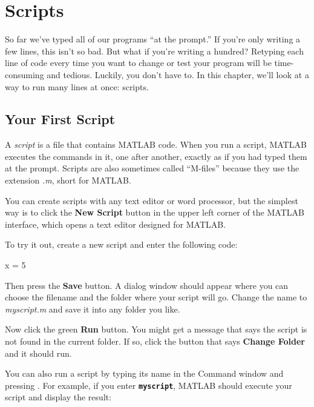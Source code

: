 \chapter{Scripts}

So far we've typed all of our programs ``at the prompt.'' If you're only writing a few lines, this isn't so bad. But what if you're writing a hundred? Retyping each line of code every time you want to change or test your program will be time-consuming and tedious. Luckily, you don't have to. In this chapter, we'll look at a way to run many lines at once: scripts.


\section{Your First Script}

A \emph{script} is a file that contains MATLAB code. When you run a script, MATLAB executes the commands in it, one after another, exactly as if you had typed them at the prompt. Scripts are
also sometimes called ``M-files'' because they use the extension {\em .m}, short for MATLAB. 


You can create scripts with any text editor or word processor, but the simplest way is to click the \textbf{New Script} button in the upper left corner of the MATLAB interface, which opens a text editor designed for MATLAB.

To try it out, create a new script and enter the following code:

\begin{code}
x = 5
\end{code}

Then press the {\bf Save} button.  A dialog window should appear where you can choose the filename and the folder where your script will go.  
Change the name to {\em myscript.m} and save it into any folder you like.

Now click the green {\bf Run} button.  You might get a message that says the script is not found in the current folder.  
If so, click the button that says {\bf Change Folder} and it should run.


You can also run a script by typing its name in the Command window and pressing . For example, if you enter \textbf{\lstinline{myscript}}, MATLAB should execute your script and display the result:

